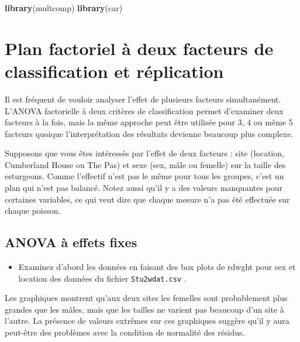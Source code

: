 \documentclass[12pt,]{book}
\newenvironment{Shaded}{\begin{snugshade}}{\end{snugshade}}
\newcommand{\KeywordTok}[1]{\textcolor[rgb]{0.13,0.29,0.53}{\textbf{#1}}}
\newcommand{\NormalTok}[1]{#1}
\providecommand{\tightlist}{%
  \setlength{\itemsep}{0pt}\setlength{\parskip}{0pt}}
\begin{document}
\begin{Shaded}
\begin{Highlighting}[]
\KeywordTok{library}\NormalTok{(multcomp)}
\KeywordTok{library}\NormalTok{(car)}
\end{Highlighting}
\end{Shaded}

\hypertarget{plan-factoriel-uxe0-deux-facteurs-de-classification-et-ruxe9plication}{%
\section{Plan factoriel à deux facteurs de classification et réplication}\label{plan-factoriel-uxe0-deux-facteurs-de-classification-et-ruxe9plication}}

Il est fréquent de vouloir analyser l'effet de plusieurs facteurs simultanément. L'ANOVA factorielle à deux critères de classification permet d'examiner deux facteurs à la fois, mais la même approche peut être utilisée pour 3, 4 ou même 5 facteurs quoique l'interprétation des résultats devienne beaucoup plus complexe.

Supposons que vous êtes intéressés par l'effet de deux facteurs : site (location, Cumberland House ou The Pas) et sexe (sex, mâle ou femelle) sur la taille des esturgeons. Comme l'effectif n'est pas le même pour tous les groupes, c'est un plan qui n'est pas balancé. Notez aussi qu'il y a des valeurs manquantes pour certaines variables, ce qui veut dire que chaque mesure n'a pas été effectuée sur chaque poisson.

\hypertarget{anova-uxe0-effets-fixes}{%
\subsection{ANOVA à effets fixes}\label{anova-uxe0-effets-fixes}}

\begin{itemize}
\tightlist
\item
  Examinez d'abord les données en faisant des box plots de rdwght pour sex et location des données du fichier \texttt{Stu2wdat.csv} .
\end{itemize}

Les graphiques montrent qu'aux deux sites les femelles sont probablement plus grandes que les mâles, mais que les tailles ne varient pas beaucoup d'un site à l'autre. La présence de valeurs extrêmes sur ces graphiques suggère qu'il y aura peut-être des problèmes avec la condition de normalité des résidus.
\end{document}
